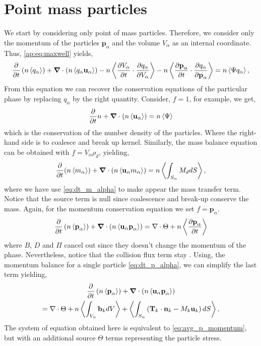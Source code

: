 \section{Point mass particles}
We start by considering only point of mass particles. 
Therefore, we consider only the momentum of the particles $\textbf{p}_\alpha$ and the volume $V_\alpha$ as an internal coordinate.
Thus, \ref{ap:eq:maxwell} yields,
\begin{equation}
    \frac{\partial}{\partial t} \left( n \left<q_\alpha\right>\right)
    + \bm{\nabla} \cdot \left(n \left<q_\alpha \textbf{u}_\alpha\right>\right)
    - n  \left<\frac{\partial V_\alpha}{\partial t} \cdot \frac{\partial q_\alpha}{\partial V_\alpha}\right>
    - n  \left<\frac{\partial \textbf{p}_\alpha}{\partial t} \cdot \frac{\partial q_\alpha}{\partial \textbf{p}_\alpha}\right>
    = n \left<\Psi q_\alpha\right>,
\end{equation}
From this equation we can recover the conservation equations of the particular phase by replacing $q_\alpha$ by the right quantity. 
Consider, $f = 1$, for example, we get, 
\begin{equation}
    \frac{\partial}{\partial t} n
    + \bm{\nabla} \cdot \left(n \left<\textbf{u}_\alpha\right>\right)
    = n\left<\Psi\right>
\end{equation}
which is the conservation of the number density of the particles. 
Where the right-hand side is to coalesce and break up kernel.
Similarly, the mass balance equation can be obtained with $f = V_\alpha \rho_d$, yielding,
\begin{equation}
    \frac{\partial}{\partial t} (n\left<m_\alpha\right>)
    + \bm{\nabla} \cdot \left(n \left<\textbf{u}_\alpha m_\alpha\right>\right)
    =
    n  \left<\int_{S_\alpha} M_d dS\right>,
\end{equation}
where we have use \ref{eq:dt_m_alpha} to make appear the mass transfer term. 
Notice that the source term is null since coalescence and break-up conserve the mass. 
Again, for the momentum conservation equation we set $f = \textbf{p}_\alpha$.
\begin{equation}
    \frac{\partial}{\partial t} \left( n \left<\textbf{p}_\alpha\right>\right)
    + \bm{\nabla} \cdot \left(n \left<\textbf{u}_\alpha \textbf{p}_\alpha\right>\right)
    =  \nabla \cdot \Theta
    + n  \left<\frac{\partial \textbf{p}_\alpha}{\partial t}\right>
\end{equation}
where $B$, $D$ and $\Pi$ cancel out since they doesn't change the momentum of the phase. 
Nevertheless, notice that the collision flux term stay \citep{rao2008introduction}.
Using, the momentum balance for a single particle \ref{eq:dt_p_alpha}, we can simplify the last term yielding, 
\begin{multline*}
    \frac{\partial}{\partial t} \left( n \left<\textbf{p}_\alpha\right>\right)
    + \bm{\nabla} \cdot \left(n \left<\textbf{u}_\alpha \textbf{p}_\alpha \right>\right)\\
    = 
    \nabla \cdot \Theta
    + n\left<\int_{V_\alpha} \textbf{b}_k dV\right>
    + \left<\int_{S_\alpha} \left(
    \textbf{T}_k\cdot\textbf{n}_k
    - M_k \textbf{u}_k
    \right)dS\right>,
\end{multline*}
The system of equation obtained here is equivalent to \ref{eq:avg_p_momentum}, but with an additional source $\Theta$ terms representing the particle stress.

